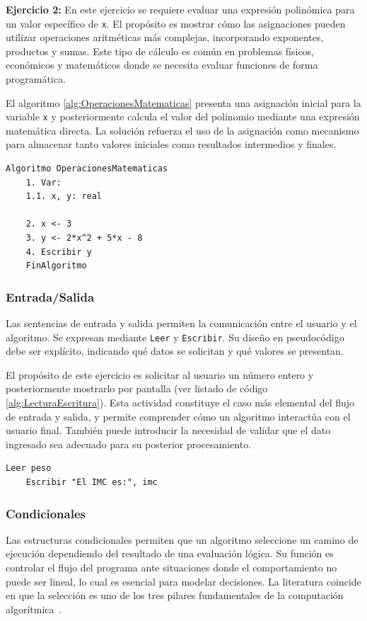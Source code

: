 \documentclass[12pt,twoside]{book}
\begin{document}
						\textbf{Ejercicio 2:} En este ejercicio se requiere evaluar una expresión polinómica para un valor específico de \texttt{x}. El propósito es mostrar cómo las asignaciones pueden utilizar operaciones aritméticas más complejas, incorporando exponentes, productos y sumas. Este tipo de cálculo es común en problemas físicos, económicos y matemáticos donde se necesita evaluar funciones de forma programática.
						
						El algoritmo \ref{alg:OperacionesMatematicas} presenta una asignación inicial para la variable \texttt{x} y posteriormente calcula el valor del polinomio mediante una expresión matemática directa. La solución refuerza el uso de la asignación como mecanismo para almacenar tanto valores iniciales como resultados intermedios y finales.
				
				\begin{lstlisting}[style=upsamStyle,caption={Asignación con potencias y productos},label={alg:OperacionesMatematicas}]
	Algoritmo OperacionesMatematicas
	1. Var:
	1.1. x, y: real
	
	2. x <- 3
	3. y <- 2*x^2 + 5*x - 8
	4. Escribir y
	FinAlgoritmo \end{lstlisting}
				
					\subsubsection{Entrada/Salida}
						\noindent
						Las sentencias de entrada y salida permiten la comunicación entre el usuario y el algoritmo. Se expresan mediante \texttt{Leer} y \texttt{Escribir}. Su diseño en pseudocódigo debe ser explícito, indicando qué datos se solicitan y qué valores se presentan.
						
						El propósito de este ejercicio es solicitar al usuario un número entero y posteriormente mostrarlo por pantalla (ver listado de código \ref{alg:LecturaEscritura}). Esta actividad constituye el caso más elemental del flujo de entrada y salida, y permite comprender cómo un algoritmo interactúa con el usuario final. También puede introducir la necesidad de validar que el dato ingresado sea adecuado para su posterior procesamiento.
						
						\begin{lstlisting}[style=upsamStyle,caption={Instrucciónes de: lectura t escritura},label={alg:LecturaEscritura}]
	Leer peso
	Escribir "El IMC es:", imc \end{lstlisting}
				
					\subsubsection{Condicionales}
						\noindent
						Las estructuras condicionales permiten que un algoritmo seleccione un camino de ejecución dependiendo del resultado de una evaluación lógica. Su función es controlar el flujo del programa ante situaciones donde el comportamiento no puede ser lineal, lo cual es esencial para modelar decisiones. La literatura coincide en que la selección es uno de los tres pilares fundamentales de la computación algorítmica~\cite{Cormen2022Introduction,Kelly2015Programming}.
						
\end{document}
